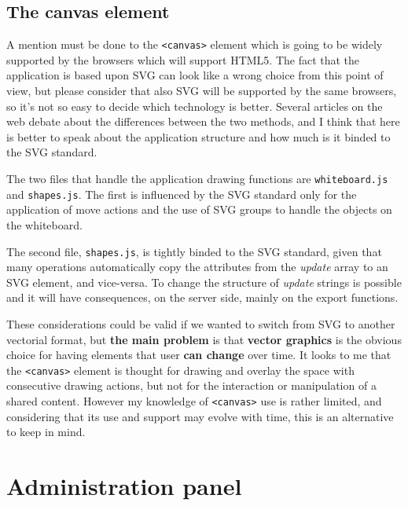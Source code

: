\documentclass[10pt,a4paper,english]{book}
\begin{document}

\hypertarget{the-canvas-element}{}
\subsection{The canvas element}
\label{the-canvas-element}

A mention must be done to the \texttt{<canvas>} element which is going to
be widely supported by the browsers which will support HTML5. The fact
that the application is based upon SVG can look like a wrong choice
from this point of view, but please consider that also SVG will be
supported by the same browsers, so it's not so easy to decide which
technology is better. Several articles on the web debate about the
differences between the two methods, and I think that here is better
to speak about the application structure and how much is it binded to
the SVG standard.

The two files that handle the application drawing functions are
\texttt{whiteboard.js} and \texttt{shapes.js}. The first is influenced by the
SVG standard only for the application of move actions and the use of
SVG groups to handle the objects on the whiteboard.

The second file, \texttt{shapes.js}, is tightly binded to the SVG standard,
given that many operations automatically copy the attributes from the
\emph{update} array to an SVG element, and vice-versa. To change the
structure of \emph{update} strings is possible and it will have
consequences, on the server side, mainly on the export functions.

These considerations could be valid if we wanted to switch from SVG to
another vectorial format, but \textbf{the main problem} is that \textbf{vector
graphics} is the obvious choice for having elements that user \textbf{can
change} over time. It looks to me that the \texttt{<canvas>} element is
thought for drawing and overlay the space with consecutive drawing
actions, but not for the interaction or manipulation of a shared
content. However my knowledge of \texttt{<canvas>} use is rather limited,
and considering that its use and support may evolve with time, this is
an alternative to keep in mind.



\hypertarget{administration-panel}{}
\section{Administration panel}
\label{administration-panel}
\end{document}

